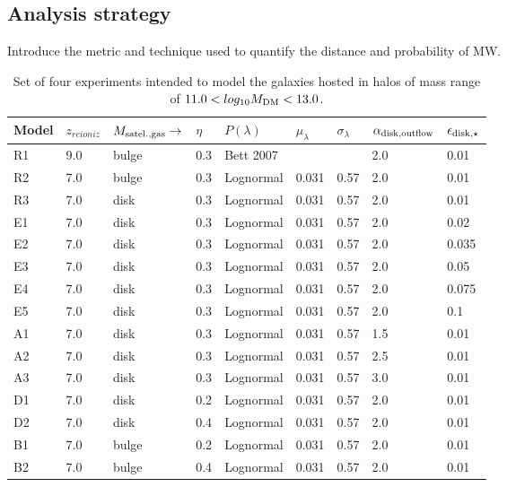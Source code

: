 \documentclass[useAMS,usenatbib]{mn2e}
\begin{document}
\subsection{Analysis strategy}
\label{sec:strategy}

Introduce the metric and technique used to quantify the distance and
probability of MW.

\begin{table}
\centering
\begin{tabular}{|l|l|l|l|l|l|l|l|l|}
\hline
\hline
Model  &  $z_{reioniz}$ &  $M_{{\rm satel.,gas}}\to$  & $\eta$ & $P(\lambda)$  &  $\mu_\lambda$
 & $\sigma_\lambda$  & $\alpha_{{\rm disk,outflow}}$ & $\epsilon_{{\rm disk},\star}$ \\
\hline
\hline
R1 & 9.0 &  bulge & 0.3 &Bett 2007 & &  & 2.0 & 0.01 \\
R2 & 7.0 &  bulge & 0.3 &Lognormal & 0.031 & 0.57 & 2.0 & 0.01 \\
R3 & 7.0 &  disk & 0.3 &Lognormal & 0.031  & 0.57 & 2.0 & 0.01 \\
\hline
E1 & 7.0 &  disk & 0.3 &Lognormal & 0.031 & 0.57 & 2.0 & 0.02 \\
E2 & 7.0 &  disk & 0.3 &Lognormal & 0.031 & 0.57 & 2.0 & 0.035 \\
E3 & 7.0 &  disk & 0.3 &Lognormal & 0.031 & 0.57 & 2.0 & 0.05 \\
E4 & 7.0 &  disk & 0.3 &Lognormal & 0.031 & 0.57 & 2.0 & 0.075 \\
E5 & 7.0 &  disk & 0.3 &Lognormal & 0.031 & 0.57 & 2.0 & 0.1 \\
\hline
A1 & 7.0 &  disk & 0.3 &Lognormal & 0.031 & 0.57 & 1.5 & 0.01 \\
A2 & 7.0 &  disk & 0.3 &Lognormal & 0.031 & 0.57 & 2.5 & 0.01 \\
A3 & 7.0 &  disk & 0.3 &Lognormal & 0.031 & 0.57 & 3.0 & 0.01 \\
\hline
D1 & 7.0 &  disk & 0.2 &Lognormal & 0.031 & 0.57 & 2.0 & 0.01 \\
D2 & 7.0 &  disk & 0.4 &Lognormal & 0.031 & 0.57 & 2.0 & 0.01 \\
\hline
B1 & 7.0 &  bulge & 0.2 &Lognormal & 0.031 & 0.57 & 2.0 & 0.01 \\
B2 & 7.0 &  bulge & 0.4 &Lognormal & 0.031 & 0.57 & 2.0 & 0.01 \\
\hline
\hline
\end{tabular}
\caption{Set of four experiments intended to model the galaxies hosted
  in halos of mass range of $11.0<log_{10} M_{{\rm
      DM}}<13.0$.}
\label{tab:runs}
\end{table}
\end{document}
